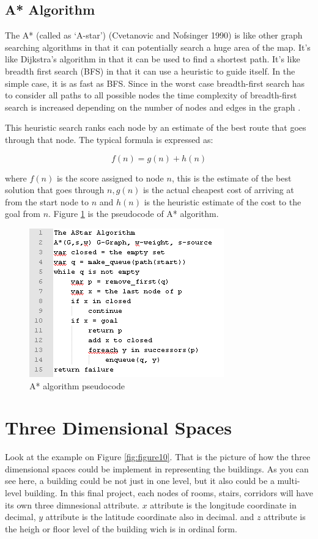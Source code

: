\subsection{A* Algorithm}
The A* (called as ‘A-star’) (Cvetanovic and Nofsinger 1990) is like other graph searching algorithms in that it can potentially search a huge area of the map. It’s like Dijkstra’s algorithm in that it can be used to find a shortest path. It’s like breadth first search (BFS) in that it can use a heuristic to guide itself. In the simple case, it is as fast as BFS. Since in the worst case breadth-first search has to consider all paths to all possible nodes the time complexity of breadth-first search is increased depending on the number of nodes and edges in the graph \cite{sathyaraj2008multiple}.

This heuristic search ranks each node by an estimate of the best route that goes through that node. The typical formula is expressed as:

\begin{equation}\label{A-star-heuristic}
f(n) = g(n) + h(n)	
\end{equation}

where $f(n)$ is the score assigned to node $n$, this is the estimate of the best solution that goes through $n, g(n)$ is the actual cheapest cost of arriving at from the start node to $n$ and $h(n)$ is the heuristic estimate of the cost to the goal from $n$. Figure \ref{fig:figure9} is the pseudocode of A* algorithm.

\begin{figure}[h!]
	\centering
	\includegraphics[scale=1]{figure9.png}
	\caption{A* algorithm pseudocode}
	\label{fig:figure9}
\end{figure}

\section{Three Dimensional Spaces}
Look at the example on Figure \ref{fig:figure10}. That is the picture of how the three dimensional spaces could be implement in representing the buildings. As you can see here, a building could be not just in one level, but it also could be a multi-level building. In this final project, each nodes of rooms, stairs, corridors will have its own three dimnesional attribute. $x$ attribute is the longitude coordinate in decimal, $y$ attribute is the latitude coordinate also in decimal. and $z$ attribute is the heigh or floor level of the building wich is in ordinal form.

